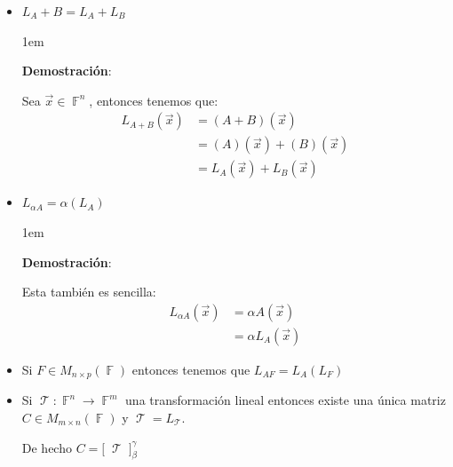 \documentclass[12pt, fleqn]{report}                             %
\newenvironment{SmallIndentation}[1][0.75em]                    %
        {\begin{adjustwidth}{#1}{}\begin{footnotesize}}             %
        {\end{footnotesize}\end{adjustwidth}}                       %
\theoremstyle{break}                                            %
\DeclareMathOperator \GenericField {\mathbb{F}}                 %
\DeclareMathOperator \LinTrans      {\mathcal{T}}               %
\newcommand{\bigBrackets}[1]    {\big[ \; #1 \; \big]}          %
\begin{document}
\begin{itemize}
\begin{SmallIndentation}[1em]
                        \end{SmallIndentation}
                            

                    \item
                        $L_A+B = L_A + L_B$

                        \begin{SmallIndentation}[1em]
                            \textbf{Demostración}:
                            
                            Sea $\vec x \in \GenericField^n$, entonces tenemos que:
                            \begin{align*}
                                L_{A + B}(\vec x)
                                    &= (A + B)(\vec x)              \\
                                    &= (A)(\vec x) + (B)(\vec x)    \\
                                    &= L_A(\vec x) + L_B(\vec x) 
                            \end{align*}
                        
                        \end{SmallIndentation}
                            

                    \item
                        $L_{\alpha A} = \alpha (L_A)$

                        \begin{SmallIndentation}[1em]
                            \textbf{Demostración}:
                            
                            Esta también es sencilla:
                            \begin{align*}
                                L_{\alpha A}(\vec x)
                                    &= \alpha A(\vec x)         \\
                                    &= \alpha L_A(\vec x)
                            \end{align*}
                        
                        \end{SmallIndentation}

                    \item
                        Si $F \in M_{n \times p}(\GenericField)$ entonces tenemos
                        que $L_{AF} = L_A(L_F)$

                    \item
                        Si $\LinTrans: \GenericField^n \to \GenericField^m$ una transformación
                        lineal entonces existe una única matriz  $C \in M_{m \times n}(\GenericField)$
                        y $\LinTrans = L_{\LinTrans}$.

                        De hecho $C = \bigBrackets{\LinTrans}_\beta^\gamma$

                \end{itemize}
\end{document}
